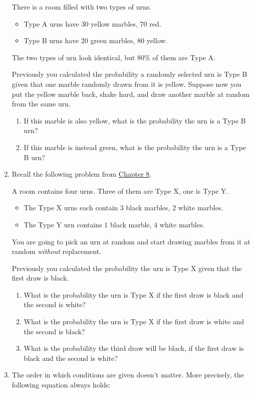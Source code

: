 \documentclass[justified]{tufte-book}
\providecommand{\tightlist}{%
  \setlength{\itemsep}{0pt}\setlength{\parskip}{0pt}}
\theoremstyle{definition}
\theoremstyle{definition}
\theoremstyle{definition}
\theoremstyle{remark}
\begin{document}
\begin{enumerate}
  There is a room filled with two types of urns.

  \begin{itemize}
  \tightlist
  \item
    Type A urns have \(30\) yellow marbles, \(70\) red.
  \item
    Type B urns have \(20\) green marbles, \(80\) yellow.
  \end{itemize}

  The two types of urn look identical, but \(80\%\) of them are Type A.

  Previously you calculated the probability a randomly selected urn is Type B given that one marble randomly drawn from it is yellow. Suppose now you put the yellow marble back, shake hard, and draw another marble at random from the same urn.

  \begin{enumerate}
  \def\labelenumii{\alph{enumii}.}
  \tightlist
  \item
    If this marble is also yellow, what is the probability the
    urn is a Type B urn?
  \item
    If this marble is instead green, what is the probability the urn
    is a Type B urn?
  \end{enumerate}
\item
  Recall the following problem from \protect\hyperlink{bayes-theorem}{Chapter 8}.

  A room contains four urns. Three of them are Type X, one is Type Y.

  \begin{itemize}
  \tightlist
  \item
    The Type X urns each contain \(3\) black marbles, \(2\) white marbles.
  \item
    The Type Y urn contains \(1\) black marble, \(4\) white marbles.
  \end{itemize}

  You are going to pick an urn at random and start drawing marbles from it at random \emph{without} replacement.

  Previously you calculated the probability the urn is Type X given that the first draw is black.

  \begin{enumerate}
  \def\labelenumii{\alph{enumii}.}
  \tightlist
  \item
    What is the probability the urn is Type X if the first draw is black and the second is white?
  \item
    What is the probability the urn is Type X if the first draw is white and the second is black?
  \item
    What is the probability the third draw will be black, if the first draw is black and the second is white?
  \end{enumerate}
\item
  The order in which conditions are given doesn't matter. More precisely, the following equation always holds:


\end{enumerate}
\end{document}
